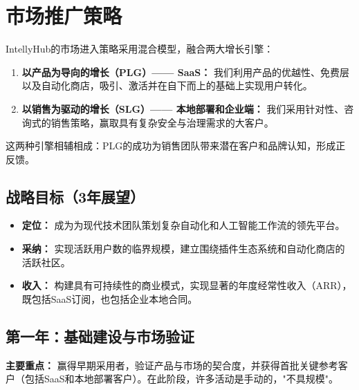 \documentclass[11点, A4纸, 单面]{article}
\begin{document}
\newpage
\section{市场推广策略}

IntellyHub的市场进入策略采用混合模型，融合两大增长引擎：
\begin{enumerate}
    \item \textbf{以产品为导向的增长（PLG）—— SaaS：} 我们利用产品的优越性、免费层以及自动化商店，吸引、激活并在自下而上的基础上实现用户转化。
    \item \textbf{以销售为驱动的增长（SLG）—— 本地部署和企业端：} 我们采用针对性、咨询式的销售策略，赢取具有复杂安全与治理需求的大客户。
\end{enumerate}
这两种引擎相辅相成：PLG的成功为销售团队带来潜在客户和品牌认知，形成正反馈。



\subsection{战略目标（3年展望）}
\begin{itemize}
    \item \textbf{定位：} 成为为现代技术团队策划复杂自动化和人工智能工作流的领先平台。
    \item \textbf{采纳：} 实现活跃用户数的临界规模，建立围绕插件生态系统和自动化商店的活跃社区。
    \item \textbf{收入：} 构建具有可持续性的商业模式，实现显著的年度经常性收入（ARR），既包括SaaS订阅，也包括企业本地合同。
\end{itemize}

\subsection{第一年：基础建设与市场验证}
\textbf{主要重点：} 赢得早期采用者，验证产品与市场的契合度，并获得首批关键参考客户（包括SaaS和本地部署客户）。在此阶段，许多活动是手动的，"不具规模"。
\end{document}
